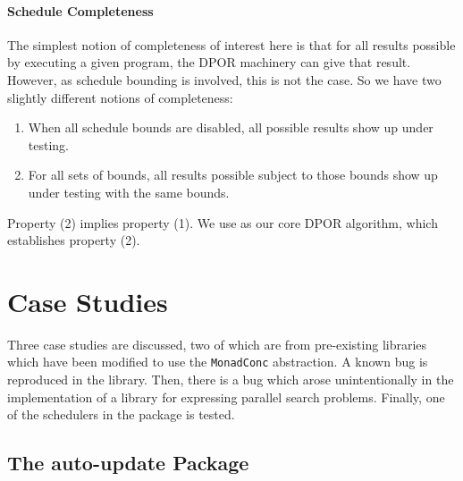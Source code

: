\paragraph{Schedule Completeness}
The simplest notion of completeness of interest here is that for all
results possible by executing a given program, the DPOR machinery can
give that result.  However, as schedule bounding is involved, this is
not the case.  So we have two slightly different notions of
completeness:

\begin{enumerate}
\item When all schedule bounds are disabled, all possible results show
  up under testing.
\item For all sets of bounds, all results possible subject to those
  bounds show up under testing with the same bounds.
\end{enumerate}

Property (2) implies property (1).  We use \cite{coons2013} as our
core DPOR algorithm, which establishes property (2).

\section{Case Studies}
\label{sec:dejafu-casestudies}

Three case studies are discussed, two of which are from pre-existing
libraries which have been modified to use the \verb|MonadConc|
abstraction.  A known bug is reproduced in the 
library.  Then, there is a bug which arose unintentionally in the
implementation of a library for expressing parallel search problems.
Finally, one of the schedulers in the  package is
tested.

\subsection{The auto-update Package}

